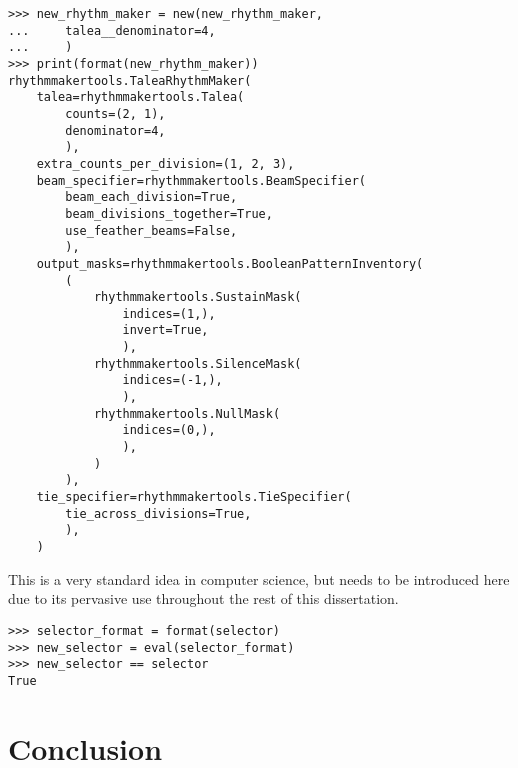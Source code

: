\begin{abjadbookoutput}
\begin{singlespacing}
\vspace{-0.5\baselineskip}
\begin{lstlisting}
>>> new_rhythm_maker = new(new_rhythm_maker,
...     talea__denominator=4,
...     )
>>> print(format(new_rhythm_maker))
rhythmmakertools.TaleaRhythmMaker(
    talea=rhythmmakertools.Talea(
        counts=(2, 1),
        denominator=4,
        ),
    extra_counts_per_division=(1, 2, 3),
    beam_specifier=rhythmmakertools.BeamSpecifier(
        beam_each_division=True,
        beam_divisions_together=True,
        use_feather_beams=False,
        ),
    output_masks=rhythmmakertools.BooleanPatternInventory(
        (
            rhythmmakertools.SustainMask(
                indices=(1,),
                invert=True,
                ),
            rhythmmakertools.SilenceMask(
                indices=(-1,),
                ),
            rhythmmakertools.NullMask(
                indices=(0,),
                ),
            )
        ),
    tie_specifier=rhythmmakertools.TieSpecifier(
        tie_across_divisions=True,
        ),
    )
\end{lstlisting}
\end{singlespacing}
\end{abjadbookoutput}

This is a very standard idea in computer science, but needs to be introduced
here due to its pervasive use throughout the rest of this dissertation.

\begin{comment}
<abjad>
selector_format = format(selector)
new_selector = eval(selector_format)
new_selector == selector
</abjad>
\end{comment}

\begin{abjadbookoutput}
\begin{singlespacing}
\vspace{-0.5\baselineskip}
\begin{lstlisting}
>>> selector_format = format(selector)
>>> new_selector = eval(selector_format)
>>> new_selector == selector
True
\end{lstlisting}
\end{singlespacing}
\end{abjadbookoutput}



\section{Conclusion}

